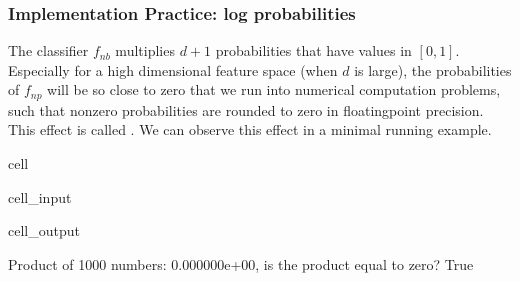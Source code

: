 \documentclass[letterpaper,10pt,english]{jupyterBook}
\begin{document}
\subsubsection{Implementation Practice: log probabilities}
\label{\detokenize{classification_naive_bayes:implementation-practice-log-probabilities}}
\sphinxAtStartPar
The classifier \(f_{nb}\) multiplies \(d+1\) probabilities that have values in \([0,1]\). Especially for a high dimensional feature space (when \(d\) is large), the probabilities of \(f_{np}\) will be so close to zero that we run into numerical computation problems, such that nonzero probabilities are rounded to zero in floating\sphinxhyphen{}point precision. This effect is called . We can observe this effect in a minimal running example.

\begin{sphinxuseclass}{cell}\begin{sphinxVerbatimInput}

\begin{sphinxuseclass}{cell_input}
\begin{sphinxVerbatim}[commandchars=\\\{\}]
   

    
  

   
\end{sphinxVerbatim}

\end{sphinxuseclass}\end{sphinxVerbatimInput}
\begin{sphinxVerbatimOutput}

\begin{sphinxuseclass}{cell_output}
\begin{sphinxVerbatim}[commandchars=\\\{\}]
Product of 1000 numbers: 0.000000e+00, is the product equal to zero? True
\end{sphinxVerbatim}

\end{sphinxuseclass}\end{sphinxVerbatimOutput}

\end{sphinxuseclass}
\end{document}
